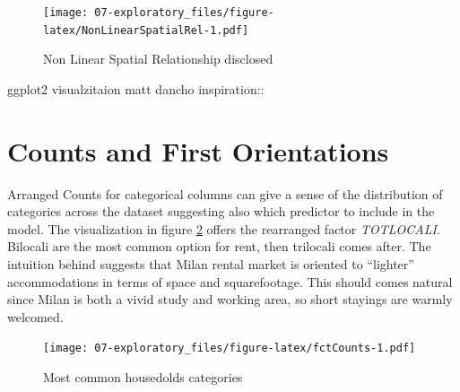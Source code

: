 \documentclass[
  12pt,
  a4paper,
  oneside]{book}
\theoremstyle{definition}
\theoremstyle{definition}
\theoremstyle{definition}
\theoremstyle{remark}
\begin{document}
\begin{figure}
\centering
\texttt{[image: 07-exploratory\_files/figure-latex/NonLinearSpatialRel-1.pdf]}
\caption{\label{fig:NonLinearSpatialRel}Non Linear Spatial Relationship disclosed}
\end{figure}

ggplot2 visualzitaion matt dancho inspiration::

\hypertarget{counts-and-first-orientations}{%
\section{Counts and First Orientations}\label{counts-and-first-orientations}}

Arranged Counts for categorical columns can give a sense of the distribution of categories across the dataset suggesting also which predictor to include in the model. The visualization in figure \ref{fig:fctCounts} offers the rearranged factor \emph{TOTLOCALI}.
Bilocali are the most common option for rent, then trilocali comes after. The intuition behind suggests that Milan rental market is oriented to ``lighter'' accommodations in terms of space and squarefootage. This should comes natural since Milan is both a vivid study and working area, so short stayings are warmly welcomed.

\begin{figure}
\centering
\texttt{[image: 07-exploratory\_files/figure-latex/fctCounts-1.pdf]}
\caption{\label{fig:fctCounts}Most common housedolds categories}
\end{figure}
\end{document}
